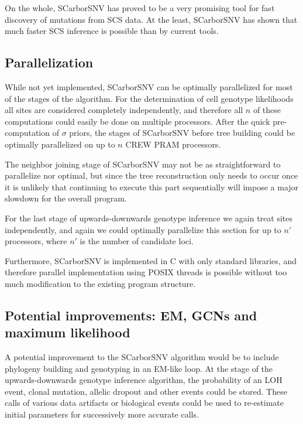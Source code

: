 \documentclass[../main.tex]{subfiles}
\begin{document}
On the whole, SCarborSNV has proved to be a very promising tool for fast discovery of mutations from SCS data.
At the least, SCarborSNV has shown that much faster SCS inference is possible than by current tools.

\subsection{Parallelization}
While not yet implemented, SCarborSNV can be optimally parallelized for most of the stages of the algorithm.
For the determination of cell genotype likelihoods all sites are considered completely independently, and therefore all $n$ of these computations could easily be done on multiple processors.
After the quick pre-computation of $\sigma$ priors, the stages of SCarborSNV before tree building could be optimally parallelized on up to $n$ CREW PRAM processors.

The neighbor joining stage of SCarborSNV may not be as straightforward to parallelize nor optimal, but since the tree reconstruction only needs to occur once it is unlikely that continuing to execute this part sequentially will impose a major slowdown for the overall program.

For the last stage of upwards-downwards genotype inference we again treat sites independently, and again we could optimally parallelize this section for up to $n'$ processors, where $n'$ is the number of candidate loci.

Furthermore, SCarborSNV is implemented in C with only standard libraries, and therefore parallel implementation using POSIX threads is possible without too much modification to the existing program structure.

\subsection{Potential improvements: EM, GCNs and maximum likelihood}
A potential improvement to the SCarborSNV algorithm would be to include phylogeny building and genotyping in an EM-like loop.
At the stage of the upwards-downwards genotype inference algorithm, the probability of an LOH event, clonal mutation, allelic dropout and other events could be stored.
These calls of various data artifacts or biological events could be used to re-estimate initial parameters for successively more accurate calls.
\end{document}
